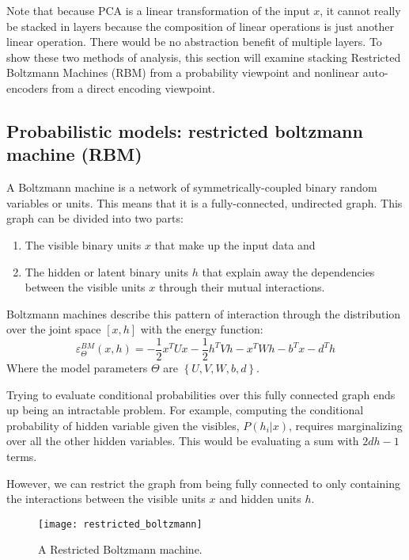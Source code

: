 Note that because PCA is a linear transformation of the input \(x\), it cannot really be stacked in layers because the composition of linear operations is just another linear operation. There would be no abstraction benefit of multiple layers. To show these two methods of analysis, this section will examine stacking Restricted Boltzmann Machines (RBM) from a probability viewpoint and nonlinear auto-encoders from a direct encoding viewpoint.

\subsection{Probabilistic models: restricted boltzmann machine (RBM)}
A Boltzmann machine is a network of symmetrically-coupled binary random variables or units. This means that it is a fully-connected, undirected graph. This graph can be divided into two parts:

\begin{enumerate}
\item The visible binary units \(x\) that make up the input data and
\item The hidden or latent binary units \(h\) that explain away the dependencies between the visible units \(x\) through their mutual interactions.
\end{enumerate}

Boltzmann machines describe this pattern of interaction through the distribution over the joint space \([x,h]\) with the energy function: 
\[\varepsilon_\Theta^{BM} (x,h) = -\frac{1}{2} x^T Ux - \frac{1}{2} h^T Vh - x^T Wh - b^T x - d^T h\]
Where the model parameters \(\Theta\) are \(\left\{U,V,W,b,d\right\}\).

Trying to evaluate conditional probabilities over this fully connected graph ends up being an intractable problem. For example, computing the conditional probability of hidden variable given the visibles, \(P(h_i | x)\), requires marginalizing over all the other hidden variables. This would be evaluating a sum with \(2dh - 1\) terms.

However, we can restrict the graph from being fully connected to only containing the interactions between the visible units \(x\) and hidden units \(h\). 

\begin{figure}[h!]
  \centering
    \texttt{[image: restricted\_boltzmann]}
\caption{A Restricted Boltzmann machine.}
\end{figure}

